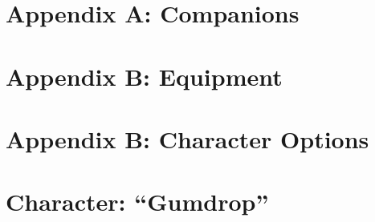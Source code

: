 \documentclass[10pt,twoside,onecolumn,openany]{book}
\begin{document}
\chapter{Appendix A: Companions}


\chapter{Appendix B: Equipment}


\chapter{Appendix B: Character Options}



\chapter{Character: “Gumdrop”}


\clearpage
\onecolumn
\renewcommand{\bibname}{References}
{}


\end{document}

